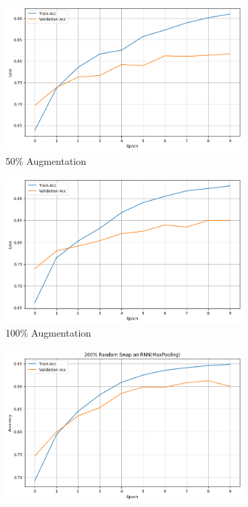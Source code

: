 \documentclass[10pt]{extarticle}
\begin{document}
\begin{figure}[ht]
  \centering
  \begin{subfigure}[b]{0.3\textwidth}
    \includegraphics[width=\textwidth]{img/random_50.png}
    \caption{50\% Augmentation}
    \label{fig:random_50}
  \end{subfigure}
  \hfill
  \begin{subfigure}[b]{0.3\textwidth}
    \includegraphics[width=\textwidth]{img/random_100.png}
    \caption{100\% Augmentation}
    \label{fig:random_100}
  \end{subfigure}
  \hfill
  \begin{subfigure}[b]{0.3\textwidth}
    \includegraphics[width=\textwidth]{img/random_200.png}

\end{subfigure}
\end{figure}
\end{document}
